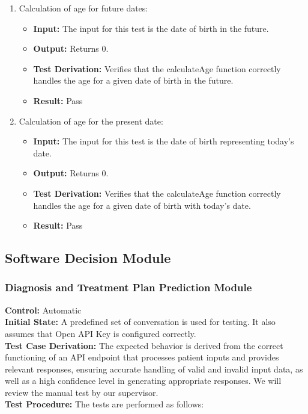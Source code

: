 \documentclass[12pt, titlepage]{article}
\begin{document}
\begin{enumerate}
    \item Calculation of age for future dates:
      \begin{itemize}
        \item \textbf{Input:} The input for this test is the date of birth in the future.    
        \item \textbf{Output:} Returns 0.
        \item \textbf{Test Derivation:} Verifies that the calculateAge function correctly handles the age for a given date of birth in the future.
        \item \textbf{Result:} Pass
      \end{itemize}

    \item Calculation of age for the present date:
      \begin{itemize}
        \item \textbf{Input:} The input for this test is the date of birth representing today's date.    
        \item \textbf{Output:} Returns 0.
        \item \textbf{Test Derivation:} Verifies that the calculateAge function correctly handles the age for a given date of birth with today's date.
        \item \textbf{Result:} Pass
      \end{itemize}
  \end{enumerate}

  \subsection{Software Decision Module}

  \subsubsection{Diagnosis and Treatment Plan Prediction Module}

  \textbf{Control:} Automatic\\
  \textbf{Initial State:} A predefined set of conversation is used for testing. It also assumes that Open API Key is configured correctly.\\
  \textbf{Test Case Derivation:} The expected behavior is derived from the correct functioning of an API endpoint that processes patient inputs and provides relevant responses, ensuring accurate handling of valid and invalid input data, as well as a high confidence level in generating appropriate responses. We will review the manual test by our supervisor.\\
  \textbf{Test Procedure:} The tests are performed as follows:\\
\end{document}

